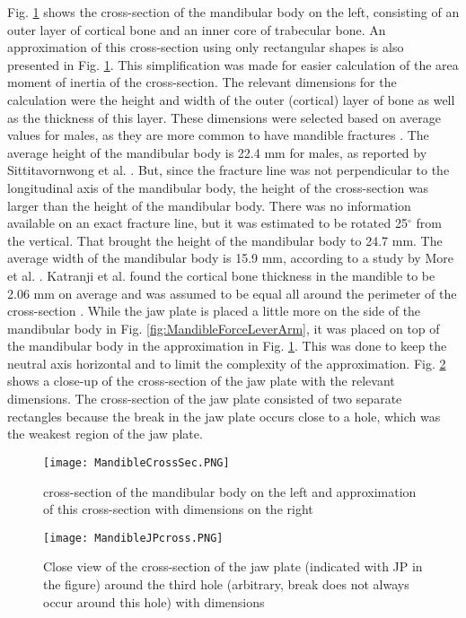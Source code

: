 Fig. \ref{fig:MandibleCrossSec} shows the cross-section of the mandibular body on the left, consisting of an outer layer of cortical bone and an inner core of trabecular bone. An approximation of this cross-section using only rectangular shapes is also presented in Fig. \ref{fig:MandibleCrossSec}. This simplification was made for easier calculation of the area moment of inertia of the cross-section. The relevant dimensions for the calculation were the height and width of the outer (cortical) layer of bone as well as the thickness of this layer. These dimensions were selected based on average values for males, as they are more common to have mandible fractures \cite{Bhavik}. The average height of the mandibular body is 22.4 mm for males, as reported by Sittitavornwong et al. \cite{Sittitavornwong}. But, since the fracture line was not perpendicular to the longitudinal axis of the mandibular body, the height of the cross-section was larger than the height of the mandibular body. There was no information available on an exact fracture line, but it was estimated to be rotated 25$^{\circ}$ from the vertical. That brought the height of the mandibular body to 24.7 mm. The average width of the mandibular body is 15.9 mm, according to a study by More et al. \cite{More}. Katranji et al. found the cortical bone thickness in the mandible to be 2.06 mm on average and was assumed to be equal all around the perimeter of the cross-section \cite{Katranji}. While the jaw plate is placed a little more on the side of the mandibular body in Fig. \ref{fig:MandibleForceLeverArm}, it was placed on top of the mandibular body in the approximation in Fig. \ref{fig:MandibleCrossSec}. This was done to keep the neutral axis horizontal and to limit the complexity of the approximation. Fig. \ref{fig:MandibleJPcross} shows a close-up of the cross-section of the jaw plate with the relevant dimensions. The cross-section of the jaw plate consisted of two separate rectangles because the break in the jaw plate occurs close to a hole, which was the weakest region of the jaw plate.

\begin{figure}[h]
    \centering
    \texttt{[image: MandibleCrossSec.PNG]}
    \caption{cross-section of the mandibular body on the left and approximation of this cross-section with dimensions on the right \cite{plos}}
    \label{fig:MandibleCrossSec}
\end{figure}

\begin{figure}[h]
    \centering
    \texttt{[image: MandibleJPcross.PNG]}
    \caption{Close view of the cross-section of the jaw plate (indicated with JP in the figure) around the third hole (arbitrary, break does not always occur around this hole) with dimensions}
    \label{fig:MandibleJPcross}
\end{figure}

